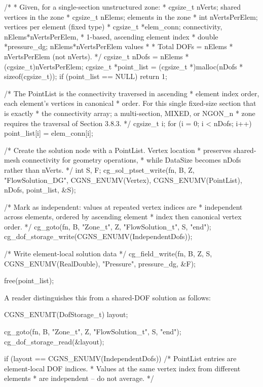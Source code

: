 \documentclass[11pt,letterpaper]{article}
\makeatletter
\let\cgns@orig@lstlisting\lstlisting
\let\cgns@endorig@lstlisting\endlstlisting
\renewenvironment{lstlisting}
  {\par\needspace{5\baselineskip}\nolinenumbers\cgns@orig@lstlisting}
  {\cgns@endorig@lstlisting\par\linenumbers}
\makeatother
\begin{document}
\begin{lstlisting}[language=C]
/*
 * Given, for a single-section unstructured zone:
 *   cgsize_t nVerts;         shared vertices in the zone
 *   cgsize_t nElems;         elements in the zone
 *   int      nVertsPerElem;  vertices per element (fixed type)
 *   cgsize_t *elem_conn;     connectivity, nElems*nVertsPerElem,
 *                            1-based, ascending element index
 *   double   *pressure_dg;   nElems*nVertsPerElem values
 *
 * Total DOFs = nElems * nVertsPerElem  (not nVerts).
 */
cgsize_t nDofs = nElems * (cgsize_t)nVertsPerElem;
cgsize_t *point_list = (cgsize_t *)malloc(nDofs * sizeof(cgsize_t));
if (point_list == NULL) return 1;

/* The PointList is the connectivity traversed in ascending
 * element index order, each element's vertices in canonical
 * order.  For this single fixed-size section that is exactly
 * the connectivity array; a multi-section, MIXED, or NGON_n
 * zone requires the traversal of Section 3.8.3. */
{
    cgsize_t i;
    for (i = 0; i < nDofs; i++)
        point_list[i] = elem_conn[i];
}

/* Create the solution node with a PointList.  Vertex location
 * preserves shared-mesh connectivity for geometry operations,
 * while DataSize becomes nDofs rather than nVerts. */
int S, F;
cg_sol_ptset_write(fn, B, Z, "FlowSolution_DG",
    CGNS_ENUMV(Vertex), CGNS_ENUMV(PointList),
    nDofs, point_list, &S);

/* Mark as independent: values at repeated vertex indices are
 * independent across elements, ordered by ascending element
 * index then canonical vertex order. */
cg_goto(fn, B, "Zone_t", Z, "FlowSolution_t", S, "end");
cg_dof_storage_write(CGNS_ENUMV(IndependentDofs));

/* Write element-local solution data */
cg_field_write(fn, B, Z, S, CGNS_ENUMV(RealDouble),
    "Pressure", pressure_dg, &F);

free(point_list);
\end{lstlisting}

A reader distinguishes this from a shared-DOF solution as follows:

\begin{lstlisting}[language=C]
CGNS_ENUMT(DofStorage_t) layout;

cg_goto(fn, B, "Zone_t", Z, "FlowSolution_t", S, "end");
cg_dof_storage_read(&layout);

if (layout == CGNS_ENUMV(IndependentDofs)) {
    /* PointList entries are element-local DOF indices.
     * Values at the same vertex index from different elements
     * are independent -- do not average. */
}
\end{lstlisting}
\end{document}
